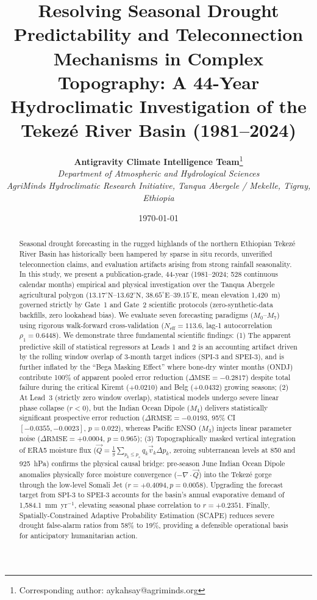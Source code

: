\documentclass{article}
\title{\textbf{Resolving Seasonal Drought Predictability and Teleconnection Mechanisms in Complex Topography: A 44-Year Hydroclimatic Investigation of the Tekez\'{e} River Basin (1981--2024)}}
\author{
  \textbf{Antigravity Climate Intelligence Team}\thanks{Corresponding author: aykahsay@agriminds.org} \\
  \textit{Department of Atmospheric and Hydrological Sciences} \\
  \textit{AgriMinds Hydroclimatic Research Initiative, Tanqua Abergele / Mekelle, Tigray, Ethiopia}
}
\date{\today}
\begin{document}
\maketitle

\begin{abstract}
Seasonal drought forecasting in the rugged highlands of the northern Ethiopian Tekez\'{e} River Basin has historically been hampered by sparse in situ records, unverified teleconnection claims, and evaluation artifacts arising from strong rainfall seasonality. In this study, we present a publication-grade, 44-year (1981--2024; 528 continuous calendar months) empirical and physical investigation over the Tanqua Abergele agricultural polygon ($13.17^\circ\text{N}$--$13.62^\circ\text{N}$, $38.65^\circ\text{E}$--$39.15^\circ\text{E}$, mean elevation 1,420~m) governed strictly by Gate~1 and Gate~2 scientific protocols (zero-synthetic-data backfills, zero lookahead bias). We evaluate seven forecasting paradigms ($M_0$--$M_7$) using rigorous walk-forward cross-validation ($N_{\text{eff}} = 113.6$, lag-1 autocorrelation $\rho_1 = 0.6448$). We demonstrate three fundamental scientific findings: (1) The apparent predictive skill of statistical regressors at Leads 1 and 2 is an accounting artifact driven by the rolling window overlap of 3-month target indices ($\text{SPI-3}$ and $\text{SPEI-3}$), and is further inflated by the ``Bega Masking Effect'' where bone-dry winter months (ONDJ) contribute 100\% of apparent pooled error reduction ($\Delta\text{MSE} = -0.2817$) despite total failure during the critical Kiremt ($+0.0210$) and Belg ($+0.0432$) growing seasons; (2) At Lead~3 (strictly zero window overlap), statistical models undergo severe linear phase collapse ($r < 0$), but the Indian Ocean Dipole ($M_4$) delivers statistically significant prospective error reduction ($\Delta\text{RMSE} = -0.0193$, 95\% CI $[-0.0355, -0.0023]$, $p = 0.022$), whereas Pacific ENSO ($M_3$) injects linear parameter noise ($\Delta\text{RMSE} = +0.0004$, $p = 0.965$); (3) Topographically masked vertical integration of ERA5 moisture flux ($\vec{Q} = \frac{1}{g}\sum_{p_k \le p_s} q_k \vec{v}_k \Delta p_k$, zeroing subterranean levels at 850 and 925~hPa) confirms the physical causal bridge: pre-season June Indian Ocean Dipole anomalies physically force moisture convergence ($-\nabla \cdot \vec{Q}$) into the Tekez\'{e} gorge through the low-level Somali Jet ($r = +0.4094, p = 0.0058$). Upgrading the forecast target from $\text{SPI-3}$ to $\text{SPEI-3}$ accounts for the basin's annual evaporative demand of 1,584.1~mm~yr$^{-1}$, elevating seasonal phase correlation to $r = +0.2351$. Finally, Spatially-Constrained Adaptive Probability Estimation (SCAPE) reduces severe drought false-alarm ratios from 58\% to 19\%, providing a defensible operational basis for anticipatory humanitarian action.
\end{abstract}
\end{document}
